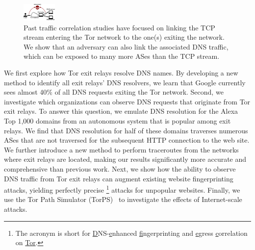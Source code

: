 \begin{figure}[t]
	\centering
	\includegraphics[width=0.65\linewidth]{figures/attack-concept.pdf}
	\caption{Past traffic correlation studies have focused on linking the TCP
		stream entering the Tor network to the one(s) exiting the network.  We
		show that an adversary can also link the associated DNS traffic, which
		can be exposed to many more ASes than the TCP stream.}
	\label{fig:overview}
\end{figure}

We first explore how Tor exit relays resolve DNS names.  By developing a new
method to identify all exit relays' DNS resolvers, we learn that Google
currently sees almost 40\% of all DNS requests exiting the Tor network.  Second,
we investigate which organizations can observe DNS requests that originate from
Tor exit relays.  To answer this question, we emulate DNS resolution for the
Alexa Top 1,000 domains from an autonomous system that is popular among exit
relays.  We find that DNS resolution for half of these domains traverses numerous
ASes that are not traversed for the subsequent HTTP connection to the web site.
We further introduce a new method to perform traceroutes from the networks where
exit relays are located, making our results significantly more accurate and
comprehensive than previous work.  Next, we show how the ability to observe DNS
traffic from Tor exit relays can augment existing website fingerprinting
attacks, yielding perfectly precise \name\footnote{The acronym is short for
\underline{D}NS-\underline{e}nhanced \underline{f}ingerprinting and
\underline{e}gress \underline{c}orrelation on \underline{Tor}.} attacks for
unpopular websites.  Finally, we use the Tor Path Simulator (TorPS)~\cite{TorPS}
to investigate the effects of Internet-scale \name attacks.

